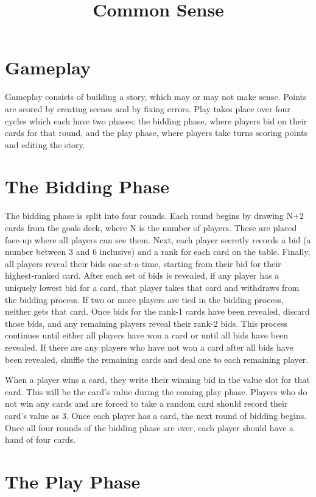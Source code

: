 \documentclass[12pt]{article}
\title{Common Sense}
\date{}
\begin{document}
\maketitle

\section{Gameplay}
%
Gameplay consists of building a story, which may or may not make sense.
%
Points are scored by creating scenes and by fixing errors.
%
Play takes place over four cycles which each have two phases: the bidding phase, where players bid on their cards for that round, and the play phase, where players take turns scoring points and editing the story.
%
%
\section{The Bidding Phase}
%
The bidding phase is split into four rounds.
%
Each round begins by drawing N+2 cards from the goals deck, where N is the number of players.
%
These are placed face-up where all players can see them.
%
Next, each player secretly records a bid (a number between 3 and 6 inclusive) and a rank for each card on the table.
%
Finally, all players reveal their bids one-at-a-time, starting from their bid for their highest-ranked card.
%
After each set of bids is revealed, if any player has a uniquely lowest bid for a card, that player takes that card and withdraws from the bidding process.
%
If two or more players are tied in the bidding process, neither gets that card.
%
Once bids for the rank-1 cards have been revealed, discard those bids, and any remaining players reveal their rank-2 bids.
%
This process continues until either all players have won a card or until all bids have been revealed.
%
If there are any players who have not won a card after all bids have been revealed, shuffle the remaining cards and deal one to each remaining player.


When a player wins a card, they write their winning bid in the value slot for that card.
%
This will be the card's value during the coming play phase.
%
Players who do not win any cards and are forced to take a random card should record their card's value as 3.
%
Once each player has a card, the next round of bidding begins.
%
Once all four rounds of the bidding phase are over, each player should have a hand of four cards.

\section{The Play Phase}
\end{document}
